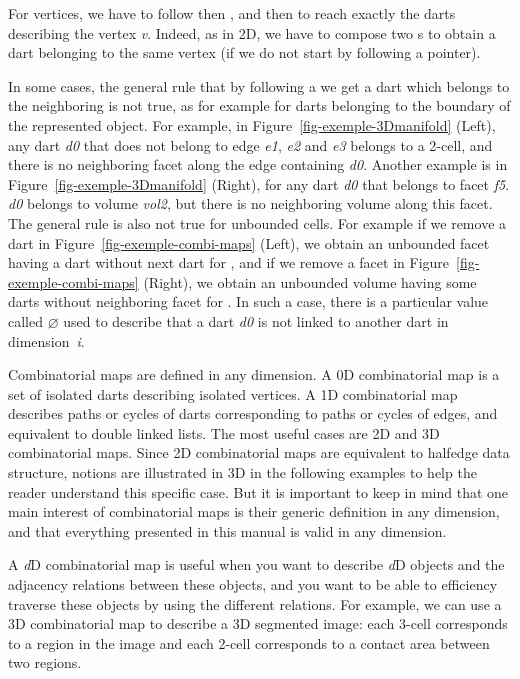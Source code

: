 For vertices, we have to follow \betadeux{} then \betaun{}, and
\betatrois{} then \betaun{} to reach exactly the darts describing the
vertex \emph{v}. Indeed, as in 2D, we have to compose two \betai{}s to
obtain a dart belonging to the same vertex (if we do not start by following a \betaun{} pointer).

In some cases, the general rule that by following a \betai{} we get a
dart which belongs to the neighboring  is not true, as for example
for darts belonging to the boundary of the represented
object. For example, in Figure~\ref{fig-exemple-3Dmanifold} (Left), any dart
\emph{d0} that does not belong to edge \emph{e1}, \emph{e2} and \emph{e3}
belongs to a 2-cell, and there is no neighboring facet along the edge containing \emph{d0}.
Another example is in Figure~\ref{fig-exemple-3Dmanifold} (Right), for
any dart \emph{d0} that belongs to facet \emph{f5}.
\emph{d0} belongs to volume \emph{vol2}, but there is no neighboring volume
along this facet.  The general rule is also not true for unbounded
cells. For example if we remove a dart in
Figure~\ref{fig-exemple-combi-maps} (Left), we obtain an unbounded
facet having a dart without next dart for \betaun{}, and if we remove
a facet in Figure~\ref{fig-exemple-combi-maps} (Right), we obtain an
unbounded volume having some darts without neighboring facet for
\betadeux{}.  In such a case, there is a particular value called
$\varnothing$ used to describe that a dart \emph{d0} is not linked to
another dart in dimension~\emph{i}.

Combinatorial maps are defined in any dimension. A 0D combinatorial
map is a set of isolated darts describing isolated vertices. A 1D
combinatorial map describes paths or cycles of darts corresponding to
paths or cycles of edges, and equivalent to double linked lists.  The
most useful cases are 2D and 3D combinatorial maps. Since 2D
combinatorial maps are equivalent to halfedge data structure, notions
are illustrated in 3D in the following examples to help the reader 
understand this specific case. But it is important to keep in mind
that one main interest of combinatorial maps is their generic
definition in any dimension, and that everything presented in this
manual is valid in any dimension.

A \emph{d}D combinatorial map is useful when you want to describe \emph{d}D
objects and the adjacency relations between these objects, and you
want to be able to efficiency traverse these objects by using the
different relations.  For example, we can use a 3D combinatorial map
to describe a 3D segmented image: each 3-cell corresponds to a region
in the image and each 2-cell corresponds to a contact area between two
regions.

